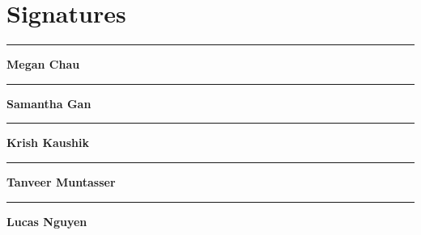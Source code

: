\documentclass{article}
\begin{document}
\section{Signatures}

\newcommand\signature[1]{%
    \noindent\begin{minipage}{5cm}
    \noindent\vspace{1.5cm}\par
    \noindent\rule{5cm}{1pt}\par
    \noindent\textbf{#1}\par
\end{minipage}}

\signature{Megan Chau}\hfill\signature{Samantha Gan}\hfill\signature{Krish Kaushik}

\signature{Tanveer Muntasser}\hfill\signature{Lucas Nguyen}%
\end{document}
